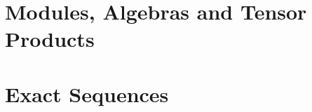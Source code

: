 \section{Modules, Algebras and Tensor Products}







\section{Exact Sequences}























